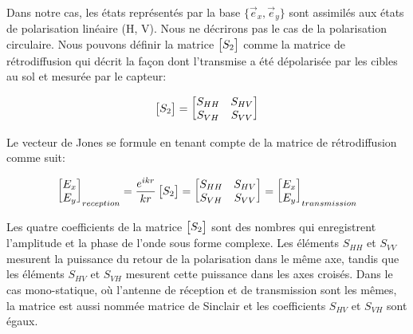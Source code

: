 \vspace{10pt}

Dans notre cas, les états représentés par la base $\{\Vec{e}_x, \Vec{e}_y\}$ sont assimilés aux états de polarisation linéaire (H, V).  Nous ne décrirons pas le cas de la polarisation circulaire.  Nous pouvons définir la matrice $\begin{bmatrix} S_2 \end{bmatrix}$ comme la matrice de rétrodiffusion qui décrit la façon dont l’\acrcroe transmise a été dépolarisée par les cibles au sol et mesurée par le capteur:

\begin{equation}
\begin{bmatrix} S_2 \end{bmatrix}=\begin{bmatrix} S_{HH} &  S_{HV} \\ S_{VH} &  S_{VV}\end{bmatrix}
\end{equation}

\vspace{10pt}

Le vecteur de Jones se formule en tenant compte de la matrice de rétrodiffusion comme suit:

\begin{equation}
\begin{bmatrix} E_x \\ E_y \end{bmatrix}_{reception} = \frac{e^{ikr}}{kr} \begin{bmatrix} S_2 \end{bmatrix}=\begin{bmatrix} S_{HH} &  S_{HV} \\ S_{VH} &  S_{VV}\end{bmatrix} = \begin{bmatrix} E_x \\ E_y \end{bmatrix}_{transmission}
\end{equation}

\vspace{10pt}

 Les quatre coefficients de la matrice  $\begin{bmatrix} S_2 \end{bmatrix}$ sont des nombres qui enregistrent l'amplitude et la phase de l'onde sous forme complexe. Les éléments $S_{HH}$ et $S_{VV}$ mesurent la puissance du retour de la polarisation dans le même axe, tandis que les éléments $S_{HV}$ et $S_{VH}$ mesurent cette puissance dans les axes croisés. Dans le cas mono-statique, où l’antenne de réception et de transmission sont les mêmes, la matrice est aussi nommée matrice de Sinclair et les coefficients $S_{HV}$ et $S_{VH}$ sont égaux. 
 
 
